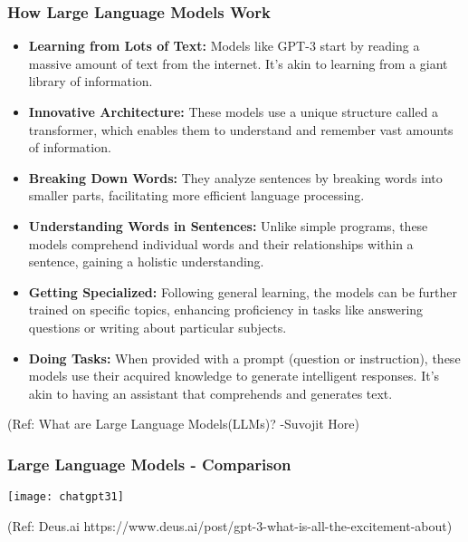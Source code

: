 \begin{frame}[fragile]\frametitle{How Large Language Models Work}
  
  \begin{itemize}
    \item \textbf{Learning from Lots of Text:} Models like GPT-3 start by reading a massive amount of text from the internet. It's akin to learning from a giant library of information.
    
    \item \textbf{Innovative Architecture:} These models use a unique structure called a transformer, which enables them to understand and remember vast amounts of information.
    
    \item \textbf{Breaking Down Words:} They analyze sentences by breaking words into smaller parts, facilitating more efficient language processing.
    
    \item \textbf{Understanding Words in Sentences:} Unlike simple programs, these models comprehend individual words and their relationships within a sentence, gaining a holistic understanding.
    
    \item \textbf{Getting Specialized:} Following general learning, the models can be further trained on specific topics, enhancing proficiency in tasks like answering questions or writing about particular subjects.
    
    \item \textbf{Doing Tasks:} When provided with a prompt (question or instruction), these models use their acquired knowledge to generate intelligent responses. It's akin to having an assistant that comprehends and generates text.
  \end{itemize}
  
  {\tiny (Ref: What are Large Language Models(LLMs)? -Suvojit Hore)}



\end{frame}


\begin{frame}[fragile]\frametitle{Large Language Models - Comparison}

\begin{center}
\texttt{[image: chatgpt31]}
\end{center}				
{\tiny (Ref: Deus.ai https://www.deus.ai/post/gpt-3-what-is-all-the-excitement-about)}

\end{frame}

